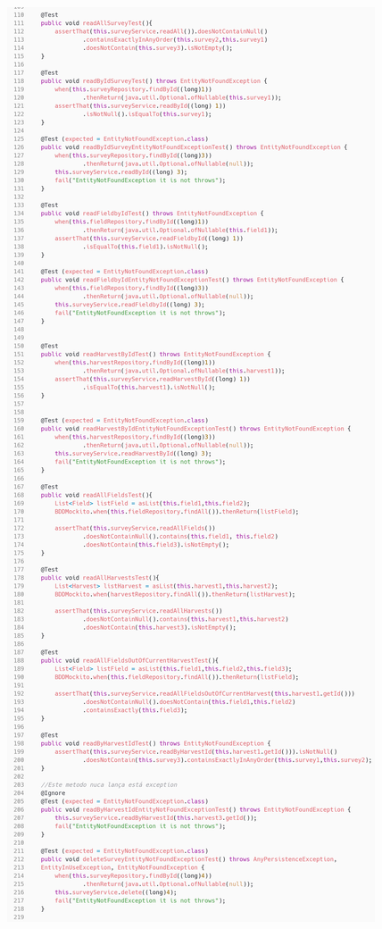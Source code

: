 \begin{figure}[H]
	\centering
	\includegraphics[scale=0.25]{dados/figuras/carbonSurveyService1.png}
\end{figure}

